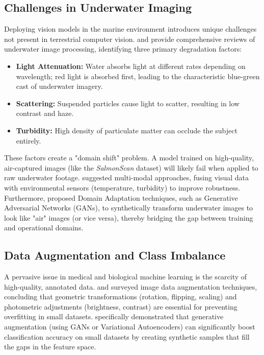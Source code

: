\documentclass[12pt,a4paper]{article}
\begin{document}
\subsection{Challenges in Underwater Imaging}
Deploying vision models in the marine environment introduces unique challenges not present in terrestrial computer vision. \cite{10048777} and \cite{JIAN2021116088} provide comprehensive reviews of underwater image processing, identifying three primary degradation factors:
\begin{itemize}
    \item \textbf{Light Attenuation:} Water absorbs light at different rates depending on wavelength; red light is absorbed first, leading to the characteristic blue-green cast of underwater imagery.
    \item \textbf{Scattering:} Suspended particles cause light to scatter, resulting in low contrast and haze.
    \item \textbf{Turbidity:} High density of particulate matter can occlude the subject entirely.
\end{itemize}

These factors create a "domain shift" problem. A model trained on high-quality, air-captured images (like the \emph{SalmonScan} dataset) will likely fail when applied to raw underwater footage. \cite{karthika2024deep} suggested multi-modal approaches, fusing visual data with environmental sensors (temperature, turbidity) to improve robustness. Furthermore, \cite{10048777} proposed Domain Adaptation techniques, such as Generative Adversarial Networks (GANs), to synthetically transform underwater images to look like "air" images (or vice versa), thereby bridging the gap between training and operational domains.

\subsection{Data Augmentation and Class Imbalance}
A pervasive issue in medical and biological machine learning is the scarcity of high-quality, annotated data. \cite{Shorten2019} and \cite{wang2017effectiveness} surveyed image data augmentation techniques, concluding that geometric transformations (rotation, flipping, scaling) and photometric adjustments (brightness, contrast) are essential for preventing overfitting in small datasets. \cite{MORENOBAREA2020113696} specifically demonstrated that generative augmentation (using GANs or Variational Autoencoders) can significantly boost classification accuracy on small datasets by creating synthetic samples that fill the gaps in the feature space.
\end{document}
